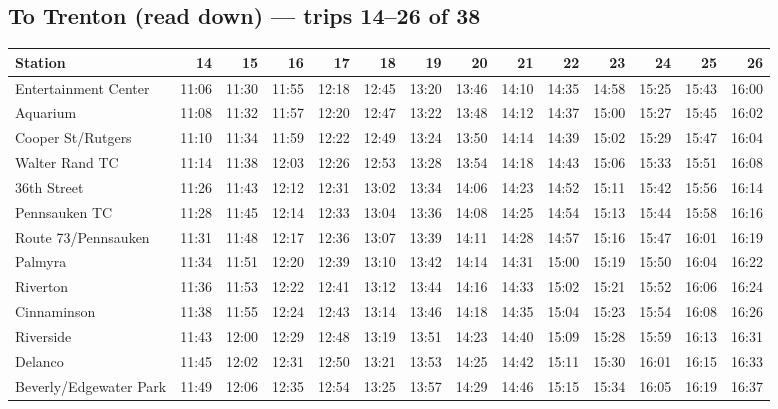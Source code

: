 \subsection*{To Trenton (read down) --- trips 14--26 of 38}
\begin{center}\footnotesize\setlength{\tabcolsep}{3pt}\begin{tabular}{@{}lrrrrrrrrrrrrr@{}}\toprule
Station & 14 & 15 & 16 & 17 & 18 & 19 & 20 & 21 & 22 & 23 & 24 & 25 & 26 \\\midrule
Entertainment Center & 11:06 & 11:30 & 11:55 & 12:18 & 12:45 & 13:20 & 13:46 & 14:10 & 14:35 & 14:58 & 15:25 & 15:43 & 16:00 \\
Aquarium & 11:08 & 11:32 & 11:57 & 12:20 & 12:47 & 13:22 & 13:48 & 14:12 & 14:37 & 15:00 & 15:27 & 15:45 & 16:02 \\
Cooper St/Rutgers & 11:10 & 11:34 & 11:59 & 12:22 & 12:49 & 13:24 & 13:50 & 14:14 & 14:39 & 15:02 & 15:29 & 15:47 & 16:04 \\
Walter Rand TC & 11:14 & 11:38 & 12:03 & 12:26 & 12:53 & 13:28 & 13:54 & 14:18 & 14:43 & 15:06 & 15:33 & 15:51 & 16:08 \\
36th Street & 11:26 & 11:43 & 12:12 & 12:31 & 13:02 & 13:34 & 14:06 & 14:23 & 14:52 & 15:11 & 15:42 & 15:56 & 16:14 \\
Pennsauken TC & 11:28 & 11:45 & 12:14 & 12:33 & 13:04 & 13:36 & 14:08 & 14:25 & 14:54 & 15:13 & 15:44 & 15:58 & 16:16 \\
Route 73/Pennsauken & 11:31 & 11:48 & 12:17 & 12:36 & 13:07 & 13:39 & 14:11 & 14:28 & 14:57 & 15:16 & 15:47 & 16:01 & 16:19 \\
Palmyra & 11:34 & 11:51 & 12:20 & 12:39 & 13:10 & 13:42 & 14:14 & 14:31 & 15:00 & 15:19 & 15:50 & 16:04 & 16:22 \\
Riverton & 11:36 & 11:53 & 12:22 & 12:41 & 13:12 & 13:44 & 14:16 & 14:33 & 15:02 & 15:21 & 15:52 & 16:06 & 16:24 \\
Cinnaminson & 11:38 & 11:55 & 12:24 & 12:43 & 13:14 & 13:46 & 14:18 & 14:35 & 15:04 & 15:23 & 15:54 & 16:08 & 16:26 \\
Riverside & 11:43 & 12:00 & 12:29 & 12:48 & 13:19 & 13:51 & 14:23 & 14:40 & 15:09 & 15:28 & 15:59 & 16:13 & 16:31 \\
Delanco & 11:45 & 12:02 & 12:31 & 12:50 & 13:21 & 13:53 & 14:25 & 14:42 & 15:11 & 15:30 & 16:01 & 16:15 & 16:33 \\
Beverly/Edgewater Park & 11:49 & 12:06 & 12:35 & 12:54 & 13:25 & 13:57 & 14:29 & 14:46 & 15:15 & 15:34 & 16:05 & 16:19 & 16:37 \\

\end{tabular}
\end{center}
